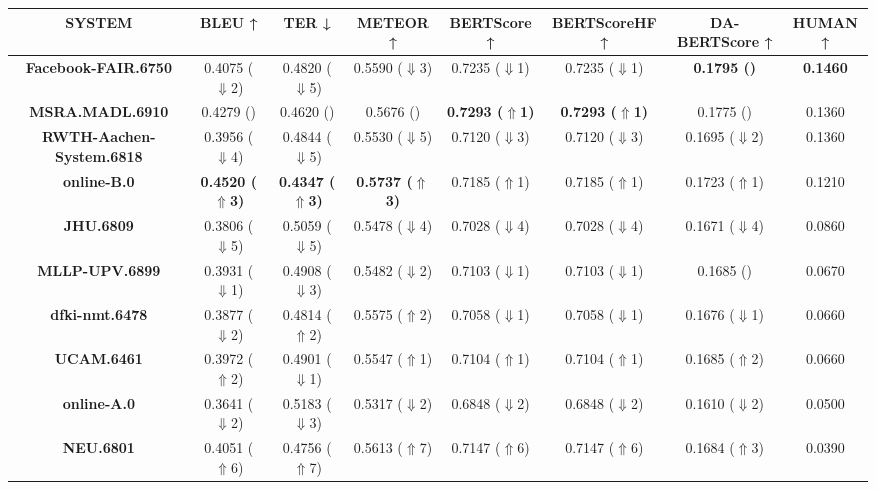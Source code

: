 \begin{table*}[ht]
\centering
\tiny
\begin{tabular}{cccccccc}
\toprule
\textbf{SYSTEM} & \textbf{BLEU ↑} & \textbf{TER ↓} & \textbf{METEOR ↑} & \textbf{BERTScore ↑} & \textbf{BERTScoreHF ↑} & \textbf{DA-BERTScore ↑} & \textbf{HUMAN ↑} \\
\midrule
\textbf{Facebook-FAIR.6750} & {0.4075 ($\Downarrow$2)} & {0.4820 ($\Downarrow$5)} & {0.5590 ($\Downarrow$3)} & {0.7235 ($\Downarrow$1)} & {0.7235 ($\Downarrow$1)} & \textbf{0.1795 (\checkmark0)} & \textbf{0.1460} \\
\textbf{MSRA.MADL.6910} & {0.4279 (\checkmark0)} & {0.4620 (\checkmark0)} & {0.5676 (\checkmark0)} & \textbf{0.7293 ($\Uparrow$1)} & \textbf{0.7293 ($\Uparrow$1)} & {0.1775 (\checkmark0)} & {0.1360} \\
\textbf{RWTH-Aachen-System.6818} & {0.3956 ($\Downarrow$4)} & {0.4844 ($\Downarrow$5)} & {0.5530 ($\Downarrow$5)} & {0.7120 ($\Downarrow$3)} & {0.7120 ($\Downarrow$3)} & {0.1695 ($\Downarrow$2)} & {0.1360} \\
\textbf{online-B.0} & \textbf{0.4520 ($\Uparrow$3)} & \textbf{0.4347 ($\Uparrow$3)} & \textbf{0.5737 ($\Uparrow$3)} & {0.7185 ($\Uparrow$1)} & {0.7185 ($\Uparrow$1)} & {0.1723 ($\Uparrow$1)} & {0.1210} \\
\textbf{JHU.6809} & {0.3806 ($\Downarrow$5)} & {0.5059 ($\Downarrow$5)} & {0.5478 ($\Downarrow$4)} & {0.7028 ($\Downarrow$4)} & {0.7028 ($\Downarrow$4)} & {0.1671 ($\Downarrow$4)} & {0.0860} \\
\textbf{MLLP-UPV.6899} & {0.3931 ($\Downarrow$1)} & {0.4908 ($\Downarrow$3)} & {0.5482 ($\Downarrow$2)} & {0.7103 ($\Downarrow$1)} & {0.7103 ($\Downarrow$1)} & {0.1685 (\checkmark0)} & {0.0670} \\
\textbf{dfki-nmt.6478} & {0.3877 ($\Downarrow$2)} & {0.4814 ($\Uparrow$2)} & {0.5575 ($\Uparrow$2)} & {0.7058 ($\Downarrow$1)} & {0.7058 ($\Downarrow$1)} & {0.1676 ($\Downarrow$1)} & {0.0660} \\
\textbf{UCAM.6461} & {0.3972 ($\Uparrow$2)} & {0.4901 ($\Downarrow$1)} & {0.5547 ($\Uparrow$1)} & {0.7104 ($\Uparrow$1)} & {0.7104 ($\Uparrow$1)} & {0.1685 ($\Uparrow$2)} & {0.0660} \\
\textbf{online-A.0} & {0.3641 ($\Downarrow$2)} & {0.5183 ($\Downarrow$3)} & {0.5317 ($\Downarrow$2)} & {0.6848 ($\Downarrow$2)} & {0.6848 ($\Downarrow$2)} & {0.1610 ($\Downarrow$2)} & {0.0500} \\
\textbf{NEU.6801} & {0.4051 ($\Uparrow$6)} & {0.4756 ($\Uparrow$7)} & {0.5613 ($\Uparrow$7)} & {0.7147 ($\Uparrow$6)} & {0.7147 ($\Uparrow$6)} & {0.1684 ($\Uparrow$3)} & {0.0390} \\

\end{tabular}
\end{table*}

